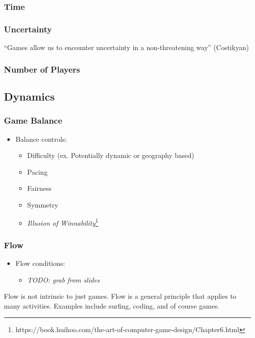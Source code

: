 \documentclass{standalone}
\begin{document}
\subsubsection{Time}\label{time}

\subsubsection{Uncertainty}\label{uncertainty}

``Games allow us to encounter uncertainty in a non-threatening way''
(Costikyan)

\subsubsection{Number of Players}\label{number-of-players}

\subsection{Dynamics}\label{dynamics}

\subsubsection{Game Balance}\label{game-balance}

\begin{itemize}
\tightlist
\item
  Balance controls:

  \begin{itemize}
  \tightlist
  \item
    Difficulty (ex. Potentially dynamic or geography based)
  \item
    Pacing
  \item
    Fairness
  \item
    Symmetry
  \item
    \emph{Illusion of Winnability}\footnote{https://book.huihoo.com/the-art-of-computer-game-design/Chapter6.html}
  \end{itemize}
\end{itemize}

\subsubsection{Flow}\label{flow}

\begin{itemize}
\item
  Flow conditions:

  \begin{itemize}
  \item
    \emph{TODO: grab from slides}
  \end{itemize}
\end{itemize}

Flow is not intrinsic to just games. Flow is a general principle that
applies to many activities. Examples include surfing, coding, and of
course games.
\end{document}
